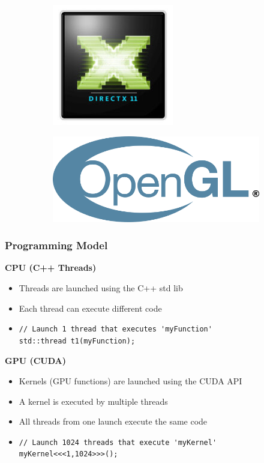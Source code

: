 \documentclass[aspectratio=169]{beamer}
\begin{document}
{\begin{figure}[!h]
\begin{subfigure}{.2\textwidth}
		\end{subfigure}
		\begin{subfigure}{.2\textwidth}
			\centering
			\includegraphics[height=.3\textheight]{d11}
		\end{subfigure}
			\begin{subfigure}{.3\textwidth}
		\centering
		\includegraphics[height=.3\textheight]{opengl}
	\end{subfigure}
	\end{figure}
}


\begin{frame} [fragile]
	\frametitle{Programming Model}
	\textbf{CPU (C++ Threads)}
	\begin{itemize}
		\item Threads are launched using the C++ std lib
		\item Each thread can execute different code
		\item %
\begin{lstlisting} 
// Launch 1 thread that executes 'myFunction'
std::thread t1(myFunction);
\end{lstlisting}
	\end{itemize}
	\textbf{GPU (CUDA)}
		\begin{itemize}
			\item Kernels (GPU functions) are launched using the CUDA API
			\item A kernel is executed by multiple threads
			\item All threads from one launch execute the same code
			\item %
\begin{lstlisting} 
// Launch 1024 threads that execute 'myKernel'
myKernel<<<1,1024>>>();
\end{lstlisting}
		\end{itemize}
\end{frame}
\end{document}
